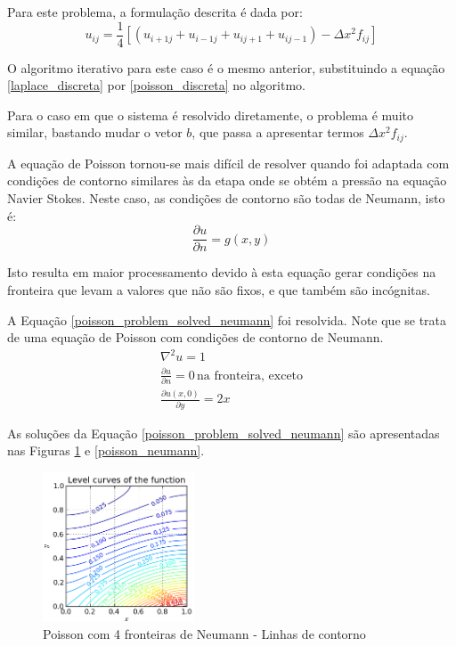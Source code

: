 \documentclass[journal]{IEEEtran}
\begin{document}
Para este problema, a formulação descrita é dada por:
\begin{equation}
u_{ij}=\frac{1}{4}[(u_{i+1j}+u_{i-1j}+u_{ij+1}+u_{ij-1})-\Delta x^2 f_{ij}] \label{poisson_discreta}
\end{equation}

O algoritmo iterativo para este caso é o mesmo anterior, substituindo a equação \ref{laplace_discreta} por \ref{poisson_discreta} no algoritmo.

Para o caso em que o sistema é resolvido diretamente, o problema é muito similar, bastando mudar o vetor $b$, que passa a apresentar termos $\Delta x^2 f_{ij}$.

A equação de Poisson tornou-se mais difícil de resolver quando foi adaptada com condições de contorno similares às da etapa onde se obtém a pressão na equação Navier Stokes. Neste caso, as condições de contorno são todas de Neumann, isto é:
\begin{equation}
\frac{\partial u}{\partial n} = g(x,y)
\end{equation}

Isto resulta em maior processamento devido à esta equação gerar condições na fronteira que levam a valores que não são fixos, e que também são incógnitas.

A Equação \ref{poisson_problem_solved_neumann} foi resolvida. Note que se trata de uma equação de Poisson com condições de contorno de Neumann.
\begin{eqnarray}
\nabla^2 u = 1 \label{poisson_problem_solved_neumann}\\
\frac{\partial u}{\partial n}=0\,\textrm{na fronteira, exceto}\\
\frac{\partial u(x,0)}{\partial y}=2x
\end{eqnarray}

As soluções da Equação \ref{poisson_problem_solved_neumann} são apresentadas nas Figuras \ref{poisson_neumann_contorno} e \ref{poisson_neumann}.
\begin{figure}[ht!]
\centering
\includegraphics[width = 0.4\textwidth]{figures/poisson_neumann_04.png}
\caption{Poisson com 4 fronteiras de Neumann - Linhas de contorno\label{poisson_neumann_contorno}}
\end{figure}
\end{document}
